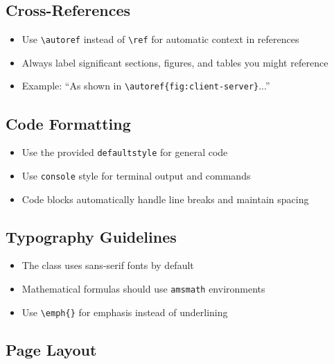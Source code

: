 \documentclass[12pt]{labmanual}
\begin{document}
\subsection{Cross-References}

\begin{itemize}
\item Use \verb|\autoref| instead of \verb|\ref| for automatic context in references
\item Always label significant sections, figures, and tables you might reference
\item Example: ``As shown in \verb|\autoref{fig:client-server}|...''
\end{itemize}

\subsection{Code Formatting}

\begin{itemize}
\item Use the provided \texttt{defaultstyle} for general code
\item Use \texttt{console} style for terminal output and commands
\item Code blocks automatically handle line breaks and maintain spacing
\end{itemize}

\subsection{Typography Guidelines}

\begin{itemize}
\item The class uses sans-serif fonts by default
\item Mathematical formulas should use \verb|amsmath| environments
\item Use \verb|\emph{}| for emphasis instead of underlining
\end{itemize}

\subsection{Page Layout}
\end{document}
